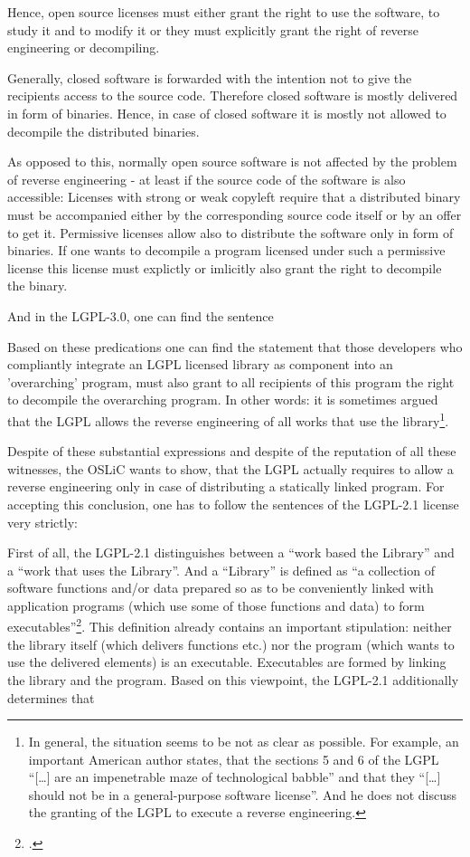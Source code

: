 Hence, open source licenses must either grant the right to use the software, to
study it and to modify it or they must explicitly grant the right of reverse
engineering or decompiling.

Generally, closed software is forwarded with the intention not to give the
recipients access to the source code. Therefore closed software is mostly
delivered in form of binaries. Hence, in case of closed software it is mostly
not allowed to decompile the distributed binaries.

As opposed to this, normally open source software is not affected by the problem
of reverse engineering - at least if the source code of the software is also
accessible: Licenses with strong or weak copyleft require that a distributed
binary must be accompanied either by the corresponding source code itself or by
an offer to get it. Permissive licenses allow also to distribute the software
only in form of binaries. If one wants to decompile a program licensed under
such a permissive license this license must explictly or imlicitly also grant
the right to decompile the binary.




And in the LGPL-3.0, one can find the sentence


Based on these predications one can find the statement that those developers who
compliantly integrate an LGPL licensed library as component into an
'overarching' program, must also grant to all recipients of this program the
right to decompile the overarching program.  In other words: it is sometimes argued
that the LGPL allows the reverse engineering of all works that use the
library\footnote{In general, the situation seems to be not as clear as possible.
For example, an important American author states, that the sections 5 and 6 of
the LGPL \enquote{[\ldots] are an impenetrable maze of technological babble} and
that they \enquote{[\ldots] should not be in a general-purpose software
license}\cite[cf.][124]{Rosen2005a}. And he does not discuss the granting of
the LGPL to execute a reverse engineering.}.

Despite of these substantial expressions and despite of the reputation of all
these witnesses, the OSLiC wants to show, that the LGPL actually requires to
allow a reverse engineering only in case of distributing a statically linked
program. For accepting this conclusion, one has to follow the sentences of the
LGPL-2.1 license very strictly:

First of all, the LGPL-2.1 distinguishes between a \enquote{work based the
Library} and a \enquote{work that uses the Library}. And a \enquote{Library} is
defined as \enquote{a collection of software functions and/or data prepared so
as to be conveniently linked with application programs (which use some of those
functions and data) to form executables}\footcite[cf.][\nopage
wp §0]{Lgpl21OsiLicense1999a}. This definition already contains an important
stipulation: neither the library itself (which delivers functions etc.) nor the
program (which wants to use the delivered elements) is an executable.
Executables are formed by linking the library and the program. Based on this
viewpoint, the LGPL-2.1 additionally determines that 

